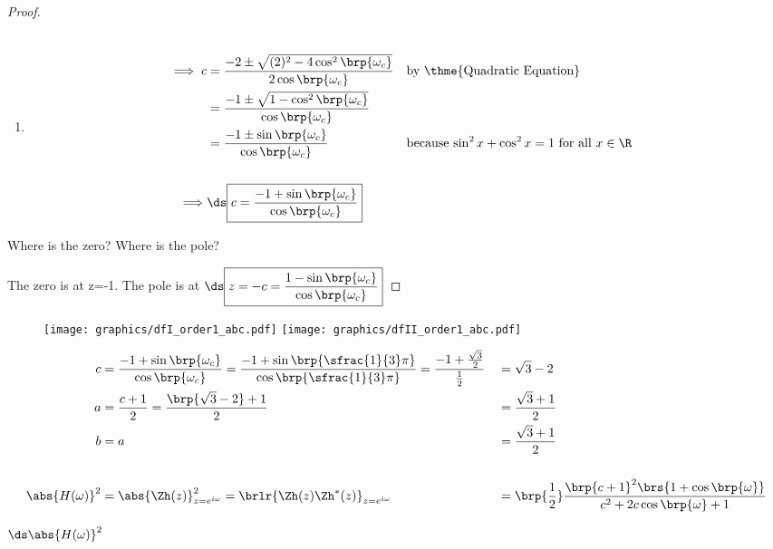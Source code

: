 \begin{proof}
\begin{enumerate}
\item 

  \begin{align*}
    \\\implies c &= \frac{-2 \pm \sqrt{(2)^2 -4\cos^2\brp{\omega_c}}}
                         {2\cos\brp{\omega_c}}
                 && \text{by \thme{Quadratic Equation}}
               \\&= \frac{-1 \pm \sqrt{1 -\cos^2\brp{\omega_c}}}
                         {\cos\brp{\omega_c}}
               \\&= \frac{-1 \pm \sin\brp{\omega_c}}
                         {\cos\brp{\omega_c}}
                 && \text{because $\sin^2x + \cos^2x = 1$ for all $x\in\R$}
    \\
    \\\implies &\ds\boxed{c = \frac{-1 + \sin\brp{\omega_c}}
                      {\cos\brp{\omega_c}}}
  \end{align*}
\end{enumerate}

Where is the zero? Where is the pole?

The zero is at z=-1. \qquad The pole is at 
$\ds\boxed{z=-c = \frac{1 - \sin\brp{\omega_c}}
                    {\cos\brp{\omega_c}}}$

\end{proof}

\begin{figure}
  \centering%
  \texttt{[image: graphics/dfI\_order1\_abc.pdf]}
  \texttt{[image: graphics/dfII\_order1\_abc.pdf]}
\end{figure}
\begin{example}[order 1 low-pass filter with corner frequency $\omega_c=\frac{2}{3}\pi$]
{ \begin{align*}
  c &= \frac{-1 + \sin\brp{\omega_c}}{\cos\brp{\omega_c}}
     = \frac{-1 + \sin\brp{\sfrac{1}{3}\pi}}{\cos\brp{\sfrac{1}{3}\pi}}
     = \frac{-1 + \frac{\sqrt{3}}{2}}{\frac{1}{2}}
   &&= \sqrt{3} - 2
  \\
  a &= \frac{c+1}{2}
     = \frac{\brp{\sqrt{3} - 2}+1}{2}
   &&= \frac{\sqrt{3}+1}{2}
  \\
  b &= a
   &&= \frac{\sqrt{3} + 1}{2}
  \\
  \\
  \abs{H(\omega)}^2
    &= \abs{\Zh(z)}^2_{z=e^{i\omega}}
     = \brlr{\Zh(z)\Zh^\ast(z)}_{z=e^{i\omega}}
   &&= \brp{\frac{1}{2}}\frac{\brp{c+1}^2\brs{1 +  \cos\brp{\omega}}}
            {c^2 + 2 c\cos\brp{\omega} + 1}
\end{align*}}

$\ds\abs{H(\omega)}^2$
\end{example}


